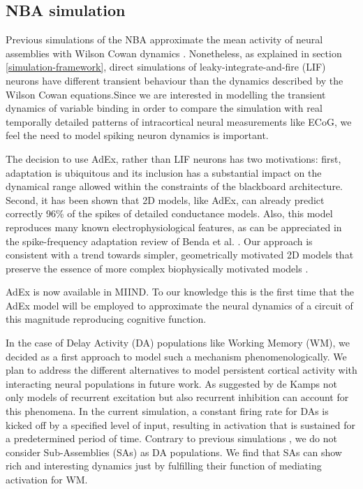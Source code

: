 \documentclass[10pt]{article}
\begin{document}
\subsection{NBA simulation}\label{architectural-decisions}

Previous simulations of the NBA approximate the mean activity of neural assemblies with Wilson Cowan dynamics \cite{Frank_2014}.
Nonetheless, as explained in section \ref{simulation-framework}, direct simulations of leaky-integrate-and-fire (LIF) neurons \cite{omurtag2000simulation} have different transient behaviour than the dynamics described by the Wilson Cowan equations.Since we are interested in modelling the transient dynamics of variable binding in order to compare 
the simulation with real temporally detailed patterns of intracortical neural measurements like ECoG, we feel the need to model spiking neuron dynamics is important.

The decision to use AdEx, rather than LIF neurons has two motivations: first, adaptation is ubiquitous and its inclusion has a substantial impact on the dynamical range
allowed within the constraints of the blackboard architecture. Second,  it has been shown that 2D models, like AdEx, can already predict correctly 96\% of the spikes of 
detailed conductance models\cite{brette2005adaptive}.  Also, this model reproduces many known electrophysiological features, as can be appreciated in the spike-frequency adaptation review of Benda et al. \cite{Benda_2003,Benda_2014}. Our approach is consistent with a trend towards simpler, geometrically motivated  2D   models  that preserve the essence of more complex biophysically motivated models \cite{izhikevich2007dynamical}.

AdEx is now available in  MIIND. To our knowledge this is the first time that the AdEx model will be employed to approximate the neural dynamics of a circuit of this magnitude reproducing cognitive function.

In the case of Delay Activity (DA) populations like Working Memory (WM), we decided as a first approach to model such a mechanism phenomenologically.
We plan to address the different alternatives to model persistent cortical activity with interacting neural populations in future work.
As suggested by de Kamps\cite{de_Kamps_2005} not only models of recurrent excitation but also recurrent inhibition can account for this phenomena.
In the current simulation, a constant firing rate for DAs is kicked off by a specified level of input, resulting in activation  that is sustained for a predetermined period of time.
Contrary to previous simulations \cite{velde2015ambiguity}, we do not consider Sub-Assemblies (SAs) as DA populations.
We find that SAs can show rich and interesting dynamics just by fulfilling their function of mediating activation for WM.
\end{document}
